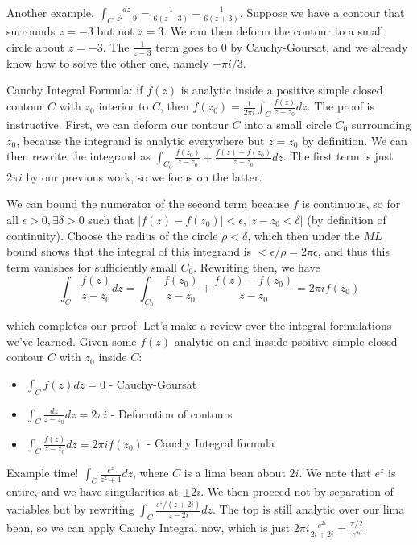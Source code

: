 \documentclass[10pt]{report}
\newcommand{\abs}[1]{\left|#1\right|}
\begin{document}
Another example, $\int_C \frac{dz}{z^2-9} = \frac{1}{6(z-3)} - \frac{1}{6(z+3)}$. Suppose we have a contour that surrounds $z=-3$ but not $z=3$. We can then deform the contour to a small circle about $z=-3$. The $\frac{1}{z-3}$ term goes to $0$ by Cauchy-Goursat, and we already know how to solve the other one, namely $-\pi i/3$. 

Cauchy Integral Formula: if $f(z)$ is analytic inside a positive simple closed contour $C$ with $z_0$ interior to $C$, then $f(z_0) = \frac{1}{2\pi i}\int_C \frac{f(z)}{z-z_0} dz$. The proof is instructive. First, we can deform our contour $C$ into a small circle $C_0$ surrounding $z_0$, because the integrand is analytic everywhere but $z=z_0$ by definition. We can then rewrite the integrand as $\int_{C_0} \frac{f(z_0)}{z-z_0} + \frac{f(z) - f(z_0)}{z-z_0} dz$. The first term is just $2\pi i$ by our previous work, so we focus on the latter. 

We can bound the numerator of the second term because $f$ is continuous, so for all $\epsilon > 0, \exists \delta > 0$ such that $\abs{f(z) - f(z_0)} < \epsilon, \abs{z-z_0 < \delta}$ (by definition of continuity). Choose the radius of the circle $\rho < \delta$, which then under the $ML$ bound shows that the integral of this integrand is $< \epsilon/\rho = 2\pi \epsilon$, and thus this term vanishes for sufficiently small $C_0$. Rewriting then, we have
$$\int_C \frac{f(z)}{z-z_0} dz = \int_{C_0} \frac{f(z_0)}{z-z_0} + \frac{f(z) - f(z_0)}{z-z_0} = 2\pi if(z_0)$$

which completes our proof. Let's make a review over the integral formulations we've learned. Given some $f(z)$ analytic on and insside psoitive simple closed contour $C$ with $z_0$ inside $C$:
\begin{itemize}
	\item $\int_C f(z) dz  = 0$ - Cauchy-Goursat
	\item $\int_C \frac{dz}{z-z_0}  dz= 2\pi i$ - Deformtion of contours
	\item $\int_C \frac{f(z)}{z-z_0} dz = 2\pi i f(z_0)$ - Cauchy Integral formula
\end{itemize}

Example time! $\int_C \frac{e^z}{z^2+4}dz$, where $C$ is a lima bean about $2i$. We note that $e^z$ is entire, and we have singularities at $\pm 2i$. We then proceed not by separation of variables but by rewriting $\int_C \frac{e^z/(z+2i)}{z-2i}dz$. The top is still analytic over our lima bean, so we can apply Cauchy Integral now, which is just $2\pi i \frac{e^{2i}}{2i + 2i} = \frac{\pi/2}{e^{2i}}$.
\end{document}
